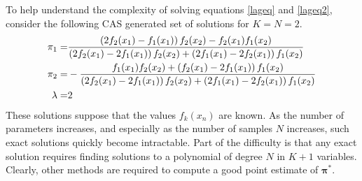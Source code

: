 To help understand the complexity of solving equations \eqref{lageq} and \eqref{lageq2}, consider the following CAS generated set of solutions for \( K=N=2 \).
\begin{align}
 \pi_{1}=& \frac{\left(2f_{2}(x_{1})-f_{1}(x_{1})
				 \right)f_{2}(x_{2})-f_{2}(x_{1})f_{1}(x_{2})}
			    {\left(2f_{2}(x_{1})-2f_{1}(x_{1})\right)f_{2}(x_{2})+
			     \left(2f_{1}(x_{1})-2f_{2}(x_{1})\right)f_{1}(x_{2})} \label{eqn:CASpi1}\\ 
\pi_{2}=&-\frac{f_{1}(x_{1})f_{2}(x_{2})+\left(f_{2}(x_{1})-2f_{1}(x_{1})\right)f_{1}(x_{2})}
			   {\left(2f_{2}(x_{1})-2f_{1}(x_{1})\right)f_{2}(x_{2})+
		        \left(2f_{1}(x_{1})-2f_{2}(x_{1})\right)f_{1}(x_{2})}\label{eqn:CASpi2}\\
\lambda=&2\label{eqn:CASlambda}
\end{align}
These solutions suppose that the values \( f_k(x_n) \) are known. As the number of parameters increases, and especially as the number of samples \( N \) increases, such exact solutions quickly become intractable.  Part of the difficulty is that any exact solution requires finding solutions to a polynomial of degree \( N \) in \( K+1 \) variables.  Clearly, other methods are required to compute a good point estimate of \( \bm\pi^{\ast} \).
%
%
%

